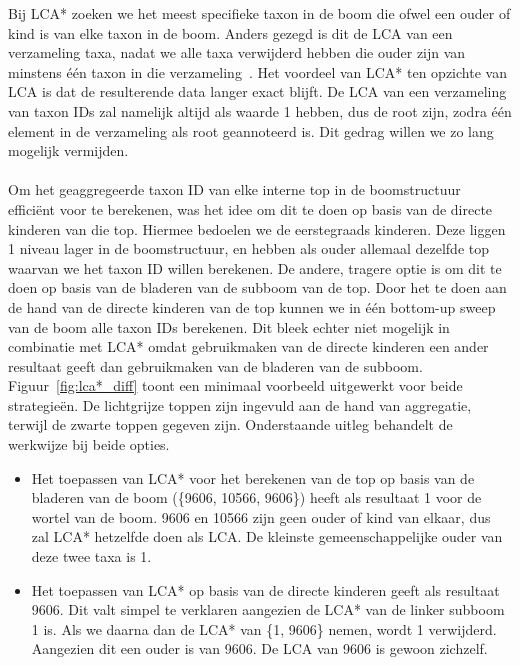 Bij LCA* zoeken we het meest specifieke taxon in de boom die ofwel een ouder of kind is van elke taxon in de boom.
Anders gezegd is dit de LCA van een verzameling taxa, nadat we alle taxa verwijderd hebben die ouder zijn van minstens één taxon in die verzameling~\cite{UMGAP_paper}.
Het voordeel van LCA* ten opzichte van LCA is dat de resulterende data langer exact blijft.
De LCA van een verzameling van taxon IDs zal namelijk altijd als waarde 1 hebben, dus de root zijn, zodra één element in de verzameling als root geannoteerd is.
Dit gedrag willen we zo lang mogelijk vermijden.
\\ \\
Om het geaggregeerde taxon ID van elke interne top in de boomstructuur efficiënt voor te berekenen, was het idee om dit te doen op basis van de directe kinderen van die top.
Hiermee bedoelen we de eerstegraads kinderen.
Deze liggen 1 niveau lager in de boomstructuur, en hebben als ouder allemaal dezelfde top waarvan we het taxon ID willen berekenen.
De andere, tragere optie is om dit te doen op basis van de bladeren van de subboom van de top.
Door het te doen aan de hand van de directe kinderen van de top kunnen we in één bottom-up sweep van de boom alle taxon IDs berekenen.
Dit bleek echter niet mogelijk in combinatie met LCA* omdat gebruikmaken van de directe kinderen een ander resultaat geeft dan gebruikmaken van de bladeren van de subboom.
Figuur~\ref{fig:lca*_diff} toont een minimaal voorbeeld uitgewerkt voor beide strategieën.
De lichtgrijze toppen zijn ingevuld aan de hand van aggregatie, terwijl de zwarte toppen gegeven zijn.
Onderstaande uitleg behandelt de werkwijze bij beide opties.
\begin{itemize}
    \item Het toepassen van LCA* voor het berekenen van de top op basis van de bladeren van de boom (\{9606, 10566, 9606\}) heeft als resultaat 1 voor de wortel van de boom.
    9606 en 10566 zijn geen ouder of kind van elkaar, dus zal LCA* hetzelfde doen als LCA\@.
    De kleinste gemeenschappelijke ouder van deze twee taxa is 1.
    \item Het toepassen van LCA* op basis van de directe kinderen geeft als resultaat 9606.
    Dit valt simpel te verklaren aangezien de LCA* van de linker subboom 1 is.
    Als we daarna dan de LCA* van \{1, 9606\} nemen, wordt 1 verwijderd.
    Aangezien dit een ouder is van 9606.
    De LCA van 9606 is gewoon zichzelf.
\end{itemize}

